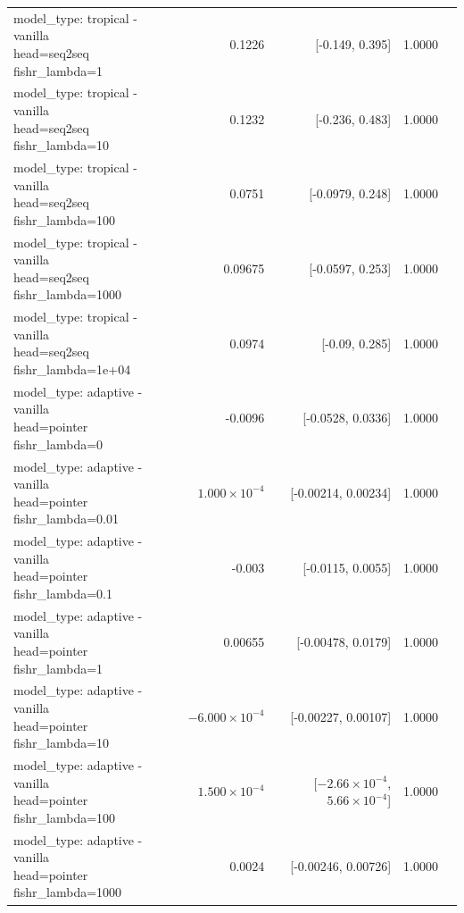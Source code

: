 \documentclass[10pt]{article}
\makeatletter
\newcommand{\stackcell}[1]{\begin{tabular}[t]{@{}l@{}}#1\end{tabular}}
\makeatother
\begin{document}
{\begin{longtable}{lrrrl}
\stackcell{model\_type: tropical - vanilla\\\footnotesize head=seq2seq fishr\_lambda=1 } & 0.1226 & [-0.149, 0.395] & 1.0000 & \\
\stackcell{model\_type: tropical - vanilla\\\footnotesize head=seq2seq fishr\_lambda=10 } & 0.1232 & [-0.236, 0.483] & 1.0000 & \\
\stackcell{model\_type: tropical - vanilla\\\footnotesize head=seq2seq fishr\_lambda=100 } & 0.0751 & [-0.0979, 0.248] & 1.0000 & \\
\stackcell{model\_type: tropical - vanilla\\\footnotesize head=seq2seq fishr\_lambda=1000 } & 0.09675 & [-0.0597, 0.253] & 1.0000 & \\
\stackcell{model\_type: tropical - vanilla\\\footnotesize head=seq2seq fishr\_lambda=1e+04 } & 0.0974 & [-0.09, 0.285] & 1.0000 & \\
\stackcell{model\_type: adaptive - vanilla\\\footnotesize head=pointer fishr\_lambda=0 } & -0.0096 & [-0.0528, 0.0336] & 1.0000 & \\
\stackcell{model\_type: adaptive - vanilla\\\footnotesize head=pointer fishr\_lambda=0.01 } & $1.000\times10^{-4}$ & [-0.00214, 0.00234] & 1.0000 & \\
\stackcell{model\_type: adaptive - vanilla\\\footnotesize head=pointer fishr\_lambda=0.1 } & -0.003 & [-0.0115, 0.0055] & 1.0000 & \\
\stackcell{model\_type: adaptive - vanilla\\\footnotesize head=pointer fishr\_lambda=1 } & 0.00655 & [-0.00478, 0.0179] & 1.0000 & \\
\stackcell{model\_type: adaptive - vanilla\\\footnotesize head=pointer fishr\_lambda=10 } & $-6.000\times10^{-4}$ & [-0.00227, 0.00107] & 1.0000 & \\
\stackcell{model\_type: adaptive - vanilla\\\footnotesize head=pointer fishr\_lambda=100 } & $1.500\times10^{-4}$ & [$-2.66\times10^{-4}$, $5.66\times10^{-4}$] & 1.0000 & \\
\stackcell{model\_type: adaptive - vanilla\\\footnotesize head=pointer fishr\_lambda=1000 } & 0.0024 & [-0.00246, 0.00726] & 1.0000 & \\

\end{longtable}}
\end{document}
